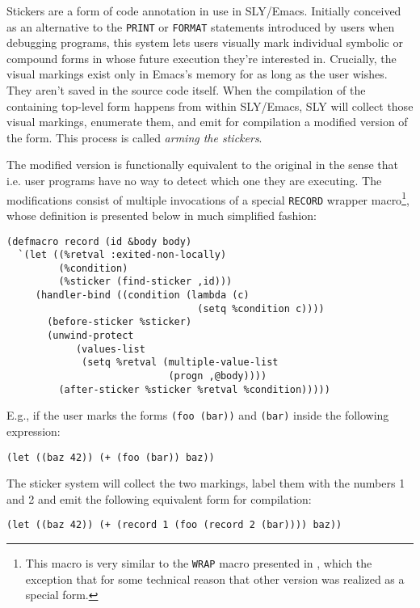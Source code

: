 \documentclass[format=sigconf]{acmart}
\begin{document}
Stickers are a form of code annotation in use in SLY/Emacs.  Initially
conceived as an alternative to the \texttt{PRINT} or \texttt{FORMAT}
statements introduced by users when debugging programs, this system
lets users visually mark individual symbolic or compound forms in
whose future execution they're interested in.  Crucially, the visual
markings exist only in Emacs's memory for as long as the user
wishes. They aren't saved in the source code itself.  When the
compilation of the containing top-level form happens from within
SLY/Emacs, SLY will collect those visual markings, enumerate them, and
emit for compilation a modified version of the form.  This process is
called \emph{arming the stickers}.

The modified version is functionally equivalent to the original in the
sense that i.e. user programs have no way to detect which one they are
executing.  The modifications consist of multiple invocations of a
special \texttt{RECORD} wrapper macro\footnote{This macro is very
  similar to the \texttt{WRAP} macro presented in
  \cite{annotation-based}, which the exception that for some technical
  reason that other version was realized as a special form.}, whose
definition is presented below in much simplified fashion:

\begin{verbatim}
(defmacro record (id &body body)
  `(let ((%retval :exited-non-locally)
         (%condition)
         (%sticker (find-sticker ,id)))
     (handler-bind ((condition (lambda (c)
                                 (setq %condition c))))
       (before-sticker %sticker)
       (unwind-protect
            (values-list
             (setq %retval (multiple-value-list
                            (progn ,@body))))
         (after-sticker %sticker %retval %condition)))))
\end{verbatim}

E.g., if the user marks the forms \texttt{(foo (bar))} and
\texttt{(bar)} inside the following expression:

\begin{verbatim}
(let ((baz 42)) (+ (foo (bar)) baz))
\end{verbatim}

The sticker system will collect the two markings, label them with the
numbers 1 and 2 and emit the following equivalent form for
compilation:

\begin{verbatim}
(let ((baz 42)) (+ (record 1 (foo (record 2 (bar)))) baz))
\end{verbatim}
\end{document}
